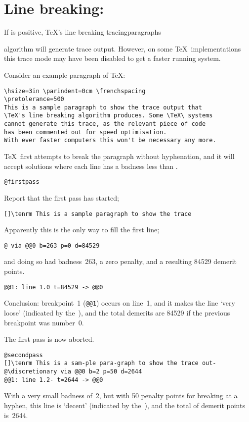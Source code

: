 \section{Line breaking: }

If  is positive, \TeX's line breaking
\cstoidx tracingparagraphs\par
algorithm will generate trace output. However, on some \TeX\
implementations this trace mode may have been disabled to get a 
faster running system.

Consider an example paragraph of \TeX:

\begin{verbatim}
\hsize=3in \parindent=0cm \frenchspacing
\pretolerance=500
This is a sample paragraph to show the trace output that
\TeX's line breaking algorithm produces. Some \TeX\ systems
cannot generate this trace, as the relevant piece of code
has been commented out for speed optimisation. 
With ever faster computers this won't be necessary any more.
\end{verbatim}

\TeX\ first attempts to break the paragraph without
hyphenation, and it will accept solutions where each
line has a badness less than .
%
\begin{verbatim}
@firstpass
\end{verbatim} Report that the first pass has started;
%
\begin{verbatim}
[]\tenrm This is a sample paragraph to show the trace 
\end{verbatim}
Apparently this is the only way to fill the first line;
%
\begin{verbatim}
@ via @@0 b=263 p=0 d=84529
\end{verbatim} and doing so
had badness~263, a zero penalty, and a resulting 84529
demerit points.
%
\begin{verbatim}
@@1: line 1.0 t=84529 -> @@0
\end{verbatim} Conclusion:
breakpoint~1 (\verb>@@1>) occurs on line~1, and it makes the
line `very loose' (indicated by the~), 
and the total demerits are
84529 if the previous breakpoint was number~0.

The first pass is now aborted.
%
\begin{verbatim}
@secondpass
[]\tenrm This is a sam-ple para-graph to show the trace out-
@\discretionary via @@0 b=2 p=50 d=2644
@@1: line 1.2- t=2644 -> @@0
\end{verbatim}
With a very small badness of~2, but with 50 penalty points
for breaking at a hyphen, this line is `decent' 
(indicated by the~), and the total of demerit points
is~2644.

